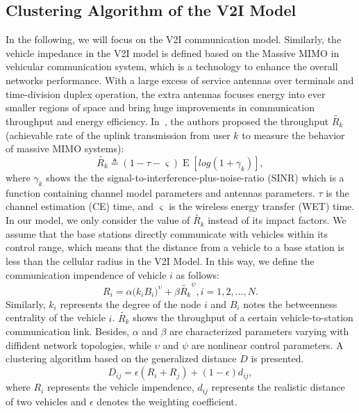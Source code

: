 \documentclass[journal,12pt,draftclsnofoot,onecolumn]{IEEEtran}
\begin{document}
\subsection{Clustering Algorithm of the V2I Model}
\label{Clustering Algorithm of the V2I Model}
In the following, we will focus on the V2I communication model. Similarly, the vehicle impedance in the V2I model is defined based on the Massive MIMO in vehicular communication system, which is a technology to enhance the overall networks performance. With a large excess of service antennas over terminals and time-division duplex operation, the extra antennas focuses energy into ever smaller regions of space and bring huge improvements in communication throughput and energy efficiency.
In~\cite{yang2014throughput}, the authors proposed the throughput $\widetilde{R_{k}}$ (achievable rate of the uplink transmission from user $k$ to measure the behavior of massive MIMO systems):
\begin{equation}\label{30}
\widetilde{{{R}_{k}}}\triangleq (1-\tau -\varsigma )\operatorname{E}[log(1+{{\gamma }_{k}})],
\end{equation}
where ${\gamma }_{k}$ shows the the signal-to-interference-plus-noise-ratio (SINR) which is a function containing channel model parameters and antennas parameters. $\tau$ is the channel estimation (CE) time, and $\varsigma$ is the wireless energy transfer (WET) time. In our model, we only consider the value of $\widetilde{{{R}_{k}}}$ instead of its impact factors. We assume that the base stations directly communicate with vehicles within its control range, which means that the distance from a vehicle to a base station is less than the cellular radius in the V2I Model. In this way, we define the communication impendence of vehicle $i$ as follows:
\begin{equation}\label{20}
{R_{i}}=\alpha {({{k}_{i}}{{B}_{i})}^{\upsilon}}+\beta {\widetilde{{{R}_{k}}}}^\psi, i=1,2,...,N.
\end{equation}
Similarly, $k_{i}$ represents the degree of the node $i$ and $B_{i}$ notes the betweenness centrality of the vehicle $i$. $\widetilde{{{R}_{k}}}$ shows the throughput of a certain vehicle-to-station communication link. Besides, $\alpha$ and $\beta$ are characterized parameters varying with diffident network topologies, while $\upsilon$ and $\psi$ are nonlinear control parameters.
A clustering algorithm based on the generalized distance $D$ is presented.
\begin{equation}\label{300}
{{D}_{ij}}=\epsilon ({{R}_{i}}+{{R}_{j}})+(1-\epsilon ){{d}_{ij}},
\end{equation}
where $R_{i}$ represents the vehicle impendence, $d_{ij}$ represents the realistic distance of two vehicles and $\epsilon$ denotes the weighting coefficient.
\end{document}
